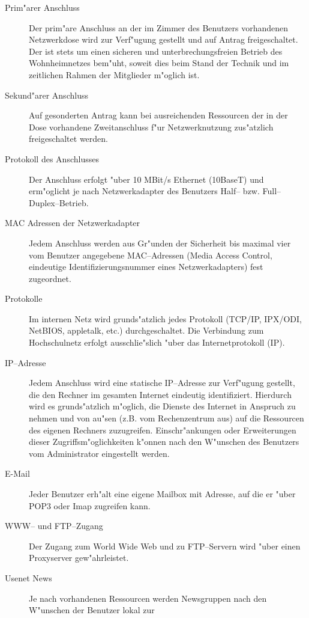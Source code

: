 \begin{description}
  \item[Prim"arer Anschluss] Der prim"are Anschluss an
      der im Zimmer des Benutzers vorhandenen Netzwerkdose wird zur
      Verf"ugung gestellt und auf Antrag freigeschaltet. Der \snev
      ist stets um einen sicheren und unterbrechungsfreien Betrieb des
      Wohnheimnetzes bem"uht, soweit dies beim Stand der Technik und im
      zeitlichen Rahmen der Mitglieder m"oglich ist.
  \item[Sekund"arer Anschluss] Auf gesonderten Antrag
      kann bei ausreichenden Ressourcen der in der Dose vorhandene
      Zweitanschluss f"ur Netzwerknutzung zus"atzlich freigeschaltet
      werden.
  \item[Protokoll des Anschlusses]  Der Anschluss erfolgt "uber
      10 MBit/s Ethernet (10BaseT) und erm"oglicht je nach Netzwerkadapter des
      Benutzers Half-- bzw. Full--Duplex--Betrieb.
  \item[MAC Adressen der Netzwerkadapter] Jedem
      Anschluss werden aus Gr"unden der Sicherheit bis maximal vier vom
      Benutzer angegebene MAC--Adressen (Media Access Control,
      eindeutige Identifizierungsnummer eines Netzwerkadapters) fest
      zugeordnet.
  \item[Protokolle] Im internen Netz wird
      grunds"atzlich jedes Protokoll (TCP/IP, IPX/ODI\tm, NetBIOS\tm,
      appletalk\tm, etc.) durchgeschaltet. Die Verbindung zum
      Hochschulnetz erfolgt ausschlie"slich "uber das Internetprotokoll
      (IP).
  \item[IP--Adresse] Jedem Anschluss wird eine statische
      IP--Adresse zur Verf"u\-gung gestellt, die den Rechner im gesamten
      Internet eindeutig identifiziert. Hierdurch wird es grunds"atzlich
      m"oglich, die Dienste des Internet in Anspruch zu nehmen und von au"sen
      (z.B. vom Rechenzentrum aus) auf die Ressourcen des eigenen Rechners
      zuzugreifen. Einschr"ankungen oder Erweiterungen dieser
      Zugriffsm"oglichkeiten k"onnen nach den W"unschen des Benutzers vom
      Administrator eingestellt werden.
  \item[E-Mail] Jeder Benutzer erh"alt eine eigene
      Mailbox mit Adresse, auf die er "uber POP3 oder Imap zugreifen
      kann.
  \item[WWW-- und FTP--Zugang] Der Zugang zum
      World Wide Web und zu FTP--Servern wird "uber einen Proxyserver
      gew"ahrleistet.
  \item[Usenet News] Je nach vorhandenen Ressourcen
      werden Newsgruppen nach den W"un\-schen der Benutzer lokal zur

\end{description}
